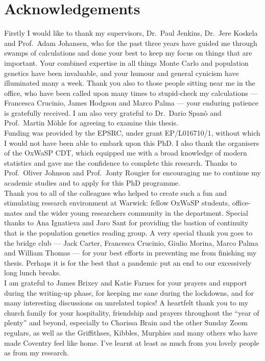 \documentclass[oneside]{scrbook} %
\theoremstyle{definition}
\newcommand{\1}[1]{\mathbbm{1}_{#1}} %
\begin{document}
\chapter*{Acknowledgements}
{\parindent0pt
Firstly I would like to thank my supervisors, Dr.\ Paul Jenkins, Dr.\ Jere Koskela and Prof.\ Adam Johansen, who for the past three years have guided me through swamps of calculations and done your best to keep my focus on things that are important.
Your combined expertise in all things Monte Carlo and population genetics have been invaluable, and your humour and general cynicism have illuminated many a week.
Thank you also to those people sitting near me in the office, who have been called upon many times to stupid-check my calculations --- Francesca Crucinio, James Hodgson and Marco Palma --- your enduring patience is gratefully received.
I am also very grateful to Dr.\ Dario Span\`o and Prof.\ Martin M\"ohle for agreeing to examine this thesis.
\\

Funding was provided by the EPSRC, under grant EP/L016710/1, without which I would not have been able to embark upon this PhD. I also thank the organisers of the OxWaSP CDT, which equipped me with a broad knowledge of modern statistics and gave me the confidence to complete this research.
Thanks to Prof.\ Oliver Johnson and Prof.\ Jonty Rougier for encouraging me to continue my academic studies and to apply for this PhD programme.
\\

Thank you to all of the colleagues who helped to create such a fun and stimulating research environment at Warwick: fellow OxWaSP students, office-mates and the wider young researchers community in the department. Special thanks to Ana Ignatieva and Jaro Sant for providing the bastion of continuity that is the population genetics reading group.
A very special thank you goes to the bridge club --- Jack Carter, Francesca Crucinio, Giulio Morina, Marco Palma and William Thomas --- for your best efforts in preventing me from finishing my thesis. Perhaps it is for the best that a pandemic put an end to our excessively long lunch breaks.
\\

I am grateful to James Brixey and Katie Farnes for your prayers and support during the writing-up phase, for keeping me sane during the lockdowns, and for many interesting discussions on unrelated topics!
A heartfelt thank you to my church family for your hospitality, friendship and prayers throughout the ``year of plenty'' and beyond, especially to Charissa Brain and the other Sunday Zoom regulars, as well as the Griffithses, Kibbles, Murphies and many others who have made Coventry feel like home. I've learnt at least as much from you lovely people as from my research.
\\

}
\end{document}
